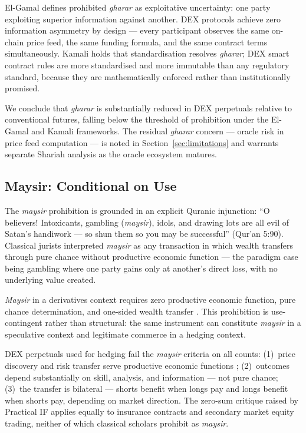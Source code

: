 \documentclass[10pt,twocolumn]{article}
\begin{document}
El-Gamal \cite{ElGamal2001} defines prohibited \textit{gharar} as exploitative
uncertainty: one party exploiting superior information against another. DEX
protocols achieve zero information asymmetry by design --- every participant
observes the same on-chain price feed, the same funding formula, and the same
contract terms simultaneously. Kamali \cite{Kamali2000} holds that
standardisation resolves \textit{gharar}; DEX smart contract rules are more
standardised and more immutable than any regulatory standard, because they are
mathematically enforced rather than institutionally promised.

We conclude that \textit{gharar} is substantially reduced in DEX perpetuals
relative to conventional futures, falling below the threshold of prohibition
under the El-Gamal and Kamali frameworks. The residual \textit{gharar} concern
--- oracle risk in price feed computation --- is noted in Section~\ref{sec:limitations}
and warrants separate Shariah analysis as the oracle ecosystem matures.

\subsection{Maysir: Conditional on Use}

The \textit{maysir} prohibition is grounded in an explicit Quranic injunction:
``O believers! Intoxicants, gambling (\textit{maysir}), idols, and drawing lots
are all evil of Satan's handiwork --- so shun them so you may be successful''
(Qur'an 5:90). Classical jurists interpreted \textit{maysir} as any
transaction in which wealth transfers through pure chance without productive
economic function --- the paradigm case being gambling where one party gains
only at another's direct loss, with no underlying value created.

\textit{Maysir} in a derivatives context requires zero productive economic
function, pure chance determination, and one-sided wealth transfer
\cite{Salamon2015,Alias2021}. This prohibition is use-contingent rather than
structural: the same instrument can constitute \textit{maysir} in a speculative
context and legitimate commerce in a hedging context.

DEX perpetuals used for hedging fail the \textit{maysir} criteria on all
counts: (1)~price discovery and risk transfer serve productive economic
functions \cite{Shiller1993}; (2)~outcomes depend substantially on skill,
analysis, and information --- not pure chance; (3)~the transfer is bilateral
--- shorts benefit when longs pay and longs benefit when shorts pay, depending
on market direction. The zero-sum critique raised by Practical IF
\cite{PracticalIF2023} applies equally to insurance contracts and secondary
market equity trading, neither of which classical scholars prohibit as
\textit{maysir}.
\end{document}
